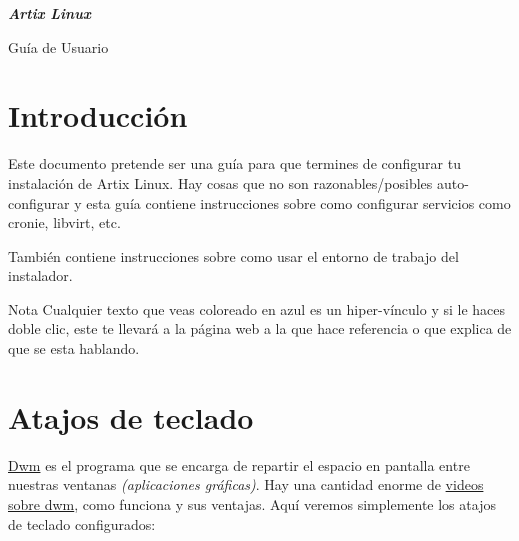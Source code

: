 \documentclass[11pt]{article}
\begin{document}
\pagestyle{empty}
\vspace*{.3\textheight}
{\hfill\Huge\itshape\textcolor{mycolor}{\textbf{Artix Linux}}\par}

{\hfill\Large Guía de Usuario\par}

\clearpage

\section{Introducción}

Este documento pretende ser una guía para que termines de configurar tu instalación de Artix Linux. Hay cosas que no son razonables/posibles auto-configurar y esta guía contiene instrucciones sobre como configurar servicios como cronie, libvirt, etc.

\vspace{10pt}

\noindent También contiene instrucciones sobre como usar el entorno de trabajo del instalador.

\begin{mybox}{Nota}
Cualquier texto que veas coloreado en azul es un hiper-vínculo y si le haces doble clic, este te llevará a la página web a la que hace referencia o que explica de que se esta hablando.
\end{mybox}

\section{Atajos de teclado}

\href{https://dwm.suckless.org}{Dwm} es el programa que se encarga de repartir el espacio en pantalla entre nuestras ventanas \textit{(aplicaciones gráficas)}. Hay una cantidad enorme de \href{https://www.youtube.com/results?search_query=dynamic+window+manager}{videos sobre dwm}, como funciona y sus ventajas. Aquí veremos simplemente los atajos de teclado configurados:

\vspace{10pt}
\end{document}
